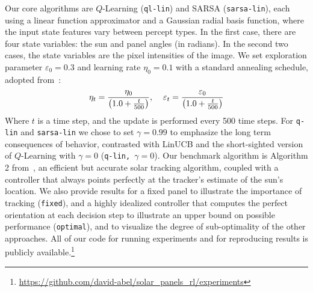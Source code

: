 \documentclass{article}
\begin{document}
Our core algorithms are $Q$-Learning (\texttt{ql-lin}) and SARSA (\texttt{sarsa-lin}), each using a linear function approximator and a Gaussian radial basis function, where the input state features vary between percept types. In the first case, there are four state variables: the sun and panel angles (in radians). In the second two cases, the state variables are the pixel intensities of the image. We set exploration parameter $\varepsilon_0=0.3$ and learning rate $\eta_0 = 0.1$ with a standard annealing schedule, adopted from~\citet{darken1990note}:
\begin{align*}
\eta_t = \frac{\eta_0}{\left(1.0 + \frac{t}{500}\right)}, \hspace{4mm} \varepsilon_t = \frac{\varepsilon_0}{\left(1.0 + \frac{t}{500}\right)}
\end{align*}
Where $t$ is a time step, and the update is performed every 500 time steps. For  \texttt{q-lin} and \texttt{sarsa-lin} we chose to set $\gamma=0.99$ to emphasize the long term consequences of behavior, contrasted with LinUCB and the short-sighted version of $Q$-Learning with $\gamma = 0$ (\texttt{q-lin, $\gamma = 0$}). Our benchmark algorithm is Algorithm 2 from~\citet{Grena2012}, an efficient but accurate solar tracking algorithm, coupled with a controller that always points perfectly at the tracker's estimate of the sun's location. We also provide results for a fixed panel to illustrate the importance of tracking (\texttt{fixed}), and a highly idealized controller that computes the perfect orientation at each decision step to illustrate an upper bound on possible performance (\texttt{optimal}), and to visualize the degree of sub-optimality of the other approaches. All of our code for running experiments and for reproducing results is publicly available.\footnote{\url{https://github.com/david-abel/solar_panels_rl/experiments}}





\end{document}
